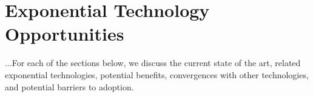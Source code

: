 \documentclass[letter,11pt]{article}
\begin{document}

\section{Exponential Technology Opportunities}

$\ldots$For each of the sections below, we discuss the current state of the art,
related exponential technologies, potential benefits, convergences with other
technologies, and potential barriers to adoption.

\secttoc
\end{document}

